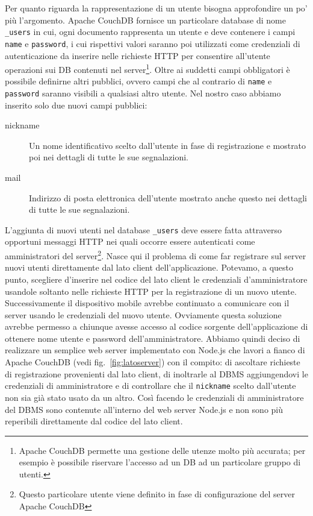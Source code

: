 		\noindent Per quanto riguarda la rappresentazione di un utente bisogna approfondire
		un po' più l'argomento. Apache CouchDB\texttrademark{} fornisce un
		particolare database di nome \verb|_users| in cui, ogni documento 
		rappresenta un utente e deve contenere i campi \texttt{name} e \texttt{password}, i cui
		rispettivi valori saranno poi utilizzati come credenziali di
		autenticazione da inserire nelle richieste HTTP per consentire
		all'utente operazioni sui DB contenuti nel server\footnote{
		Apache CouchDB\texttrademark{} permette una gestione delle utenze molto
		più accurata; per esempio è possibile riservare l'accesso ad un DB ad un
		particolare gruppo di utenti.}. Oltre ai suddetti campi obbligatori è
		possibile definirne altri pubblici, ovvero campi che al contrario di
		\texttt{name} e \texttt{password} saranno visibili a qualsiasi altro utente.
		Nel nostro caso abbiamo inserito solo due nuovi campi pubblici:
		\begin{description}
			\item[nickname] Un nome identificativo scelto dall'utente in fase di
				registrazione e mostrato poi nei dettagli di tutte le sue segnalazioni.
			\item[mail] Indirizzo di posta elettronica dell'utente mostrato anche questo
				nei dettagli di tutte le sue segnalazioni.
		\end{description}
		
		\noindent L'aggiunta di nuovi utenti nel database \verb|_users| deve essere fatta
		attraverso opportuni messaggi HTTP nei quali occorre essere autenticati
		come amministratori del server\footnote{Questo particolare utente viene
		definito in fase di configurazione del server Apache CouchDB\texttrademark{}}.
		Nasce qui il problema di come far registrare sul server nuovi utenti
		direttamente dal lato client dell'applicazione. Potevamo, a questo punto,
		scegliere d'inserire nel codice del lato client le credenziali
		d'amministratore usandole soltanto nelle richieste HTTP per la registrazione
		di un nuovo utente.	Successivamente il dispositivo mobile avrebbe continuato a
		comunicare con il server usando le credenziali del nuovo utente. Ovviamente
		questa soluzione avrebbe permesso a chiunque avesse accesso al codice
		sorgente dell'applicazione di ottenere nome utente e password dell'amministratore.
		Abbiamo quindi deciso di realizzare un semplice web server implementato
		con Node.js che lavori a fianco di Apache CouchDB\texttrademark{}
		(vedi fig.~\ref{fig:latoserver}) con il
		compito: di ascoltare richieste di registrazione provenienti dal lato
		client, di inoltrarle al DBMS aggiungendovi le credenziali di amministratore
		e di controllare che il \texttt{nickname} scelto dall'utente non sia già
		stato usato da un altro. Così facendo le credenziali di amministratore
		del DBMS sono contenute all'interno del web server Node.js e non sono più
		reperibili direttamente dal codice del lato client. 
		
